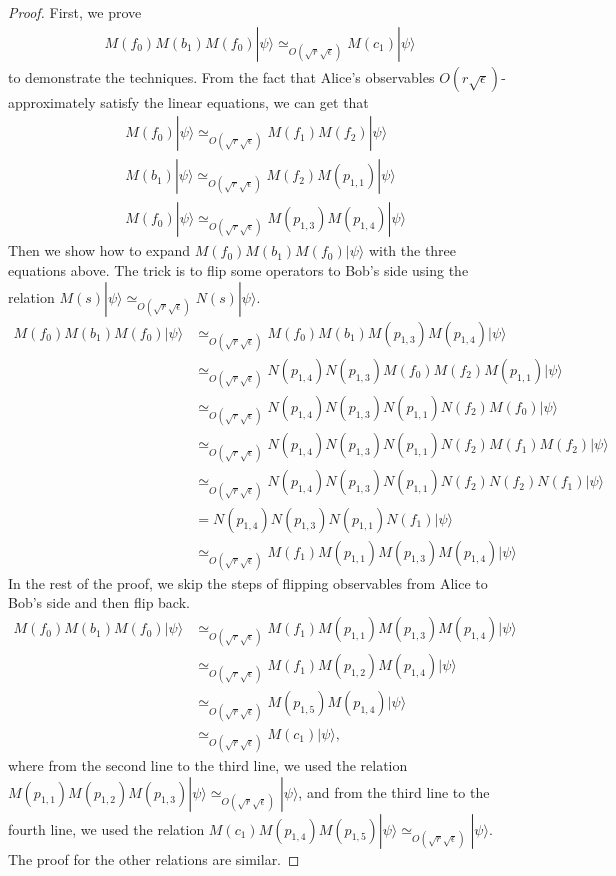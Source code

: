 \documentclass[11pt,letterpaper]{article}
\newcommand{\ket}[1]{|#1\rangle}
\newcommand{\1}{\mathbb{1}}
\newcommand{\se}{\sqrt{\epsilon}}
\newcommand{\sr}{\sqrt{r}}
\newcommand{\appd}[1]{\simeq_{#1}}
\theoremstyle{definition}
\begin{document}
\begin{proof}
    First, we prove 
    \begin{align}
        \label{eq:f0b1}
        M(f_0)M(b_1)M(f_0) \ket{\psi} \appd{O(\sr\se)} M(c_1)\ket{\psi}
    \end{align}
    to demonstrate the techniques.
    From the fact that Alice's observables $O(r\se)$-approximately satisfy the linear equations, we can get that
    \begin{align*}
        &M(f_0) \ket{\psi} \appd{O(\sr \se)} M(f_1)M(f_2)\ket{\psi} \\
        &M(b_1) \ket{\psi} \appd{O(\sr \se)} M(f_2)M(p_{1,1}) \ket{\psi}\\
        &M(f_0) \ket{\psi} \appd{O(\sr \se)} M(p_{1,3})M(p_{1,4}) \ket{\psi}
    \end{align*}
    Then we show how to expand $M(f_0)M(b_1)M(f_0)\ket{\psi}$
    with the three equations above. The trick is to flip some 
    operators to Bob's side using the relation $M(s) \ket{\psi} \appd{O(\sr \se)} N(s)\ket{\psi}$.
    \begin{align*}
        M(f_0)M(b_1)M(f_0) \ket{\psi} 
        &\appd{O(\sr \se)}M(f_0)M(b_1)M(p_{1,3})M(p_{1,4}) \ket{\psi} \\
        &\appd{O(\sr \se)} N(p_{1,4})N(p_{1,3})M(f_0)M(f_2)M(p_{1,1}) \ket{\psi} \\
        &\appd{O(\sr \se)} N(p_{1,4})N(p_{1,3})N(p_{1,1})N(f_2)M(f_0) \ket{\psi} \\
        &\appd{O(\sr \se)} N(p_{1,4})N(p_{1,3})N(p_{1,1})N(f_2)M(f_1)M(f_2) \ket{\psi} \\
        & \appd{O(\sr \se)} N(p_{1,4})N(p_{1,3})N(p_{1,1})N(f_2)N(f_2)N(f_1) \ket{\psi} \\
        &= N(p_{1,4})N(p_{1,3})N(p_{1,1})N(f_1) \ket{\psi} \\
        & \appd{O(\sr \se)} M(f_1)M(p_{1,1})M(p_{1,3})M(p_{1,4}) \ket{\psi}
    \end{align*}
    In the rest of the proof, we skip the steps of flipping observables from Alice to Bob's side and then flip back.
    \begin{align*}
        M(f_0)M(b_1)M(f_0) \ket{\psi}
        &\appd{O(\sr \se)} M(f_1)M(p_{1,1})M(p_{1,3})M(p_{1,4}) \ket{\psi}\\
        &\appd{O(\sr \se)} M(f_1)M(p_{1,2})M(p_{1,4})\ket{\psi} \\
        &\appd{O(\sr \se)} M(p_{1,5})M(p_{1,4})\ket{\psi} \\
        & \appd{O(\sr \se)} M(c_1) \ket{\psi},
    \end{align*}
    where from the second line to the third line, we used
    the relation $M(p_{1,1})M(p_{1,2})M(p_{1,3})\ket{\psi} \appd{O(\sr \se)} \ket{\psi}$, and from the third line to the
    fourth line, we used the relation 
    $M(c_1)M(p_{1,4})M(p_{1,5})\ket{\psi} \appd{O(\sr \se)} \ket{\psi}$.
    The proof for the other relations are similar.
\end{proof}
\end{document}
